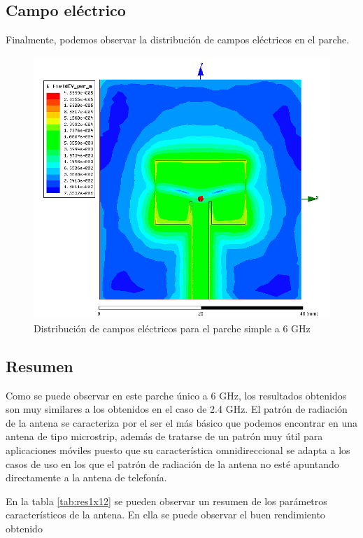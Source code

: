 \newpage
\subsection{Campo eléctrico}
\par Finalmente, podemos observar la distribución de campos eléctricos en el parche. 

\begin{figure}[H]
    \centering
        \includegraphics[width=\textwidth]{archivos/analisis/1x12/8}
        \caption{Distribución de campos eléctricos para el parche simple a 6 GHz}
        \label{fig:elec1x12}
\end{figure}


\subsection{Resumen}
\par Como se puede observar en este parche único a 6 GHz, los resultados obtenidos son muy similares a los obtenidos en el caso de 2.4 GHz. El patrón de radiación de la antena se caracteriza por el ser el más básico que podemos encontrar en una antena de tipo microstrip, además de tratarse de un patrón muy útil para aplicaciones móviles puesto que su característica omnidireccional se adapta a los casos de uso en los que el patrón de radiación de la antena no esté apuntando directamente a la antena de telefonía. 
\\
\par En la tabla \ref{tab:res1x12} se pueden observar un resumen de los parámetros característicos de la antena. En ella se puede observar el buen rendimiento obtenido

